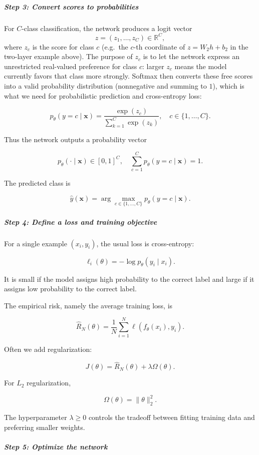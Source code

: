 \documentclass[11pt,a4paper]{article}
\theoremstyle{definition}
\begin{document}
\subparagraph{Step 3: Convert scores to probabilities}

For $C$-class classification, the network produces a logit vector
\[
z = (z_1,\dots,z_C) \in \mathbb{R}^C,
\]
where $z_c$ is the score for class $c$ (e.g.\ the $c$-th coordinate of $z = W_2 h + b_2$ in the two-layer example above).
The purpose of $z_c$ is to let the network express an unrestricted real-valued preference for class $c$: larger $z_c$ means the model currently favors that class more strongly.
Softmax then converts these free scores into a valid probability distribution (nonnegative and summing to $1$), which is what we need for probabilistic prediction and cross-entropy loss:

\[
p_{\theta}(y = c \mid \boldsymbol{x}) = \frac{\exp(z_c)}{\sum_{k=1}^{C} \exp(z_k)}, \quad c \in \{1, \dots, C\}.
\]

Thus the network outputs a probability vector

\[
p_{\theta}(\cdot \mid \boldsymbol{x}) \in [0, 1]^C, \quad \sum_{c=1}^{C} p_{\theta}(y = c \mid \boldsymbol{x}) = 1.
\]

The predicted class is

\[
\hat{y}(\boldsymbol{x}) = \arg \max_{c \in \{1, \dots, C\}} p_{\theta}(y = c \mid \boldsymbol{x}).
\]

\subparagraph{Step 4: Define a loss and training objective}

For a single example $(x_i, y_i)$, the usual loss is cross-entropy:

$$\ell_i(\theta) = -\log p_\theta(y_i \mid x_i).$$

It is small if the model assigns high probability to the correct label and large if it assigns low probability to the correct label.

The empirical risk, namely the average training loss, is

$$\widehat{R}_N(\theta) = \frac{1}{N} \sum_{i=1}^N \ell(f_\theta(x_i), y_i).$$

Often we add regularization:

$$J(\theta) = \widehat{R}_N(\theta) + \lambda\Omega(\theta).$$

For $L_2$ regularization,

$$\Omega(\theta) = \|\theta\|_2^2.$$

The hyperparameter $\lambda \geq 0$ controls the tradeoff between fitting training data and preferring smaller weights.

\subparagraph{Step 5: Optimize the network}
\end{document}
